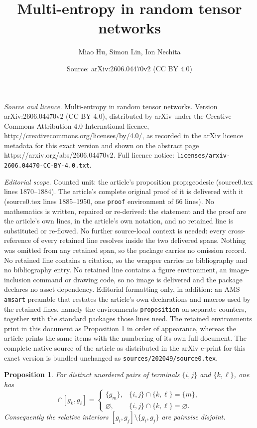 \documentclass[10pt,a4paper]{amsart}
\title{Multi-entropy in random tensor networks}
\author{Miao Hu, Simon Lin, Ion Nechita}
\date{Source: arXiv:2606.04470v2 (CC BY 4.0)}
\newtheorem{proposition}{Proposition}
\begin{document}
\maketitle

\noindent\emph{Source and licence.} Multi-entropy in random tensor networks. Version arXiv:2606.04470v2 (CC BY 4.0), distributed by arXiv under the Creative Commons Attribution 4.0 International licence, http://creativecommons.org/licenses/by/4.0/, as recorded in the arXiv licence metadata for this exact version and shown on the abstract page https://arxiv.org/abs/2606.04470v2. Full licence notice: \texttt{licenses/arxiv-2606.04470-CC-BY-4.0.txt}.\par\smallskip

\noindent\textit{Editorial scope.} Counted unit: the article's proposition prop:geodesic (source0.tex lines 1870--1884). The article's complete original proof of it is delivered with it (source0.tex lines 1885--1950, one \texttt{proof} environment of 66 lines). No mathematics is written, repaired or re-derived: the statement and the proof are the article's own lines, in the article's own notation, and no retained line is substituted or re-flowed.  No further source-local context is needed: every cross-reference of every retained line resolves inside the two delivered spans.  Nothing was omitted from any retained span, so the package carries no omission record.  No retained line contains a citation, so the wrapper carries no bibliography and no bibliography entry.  No retained line contains a figure environment, an image-inclusion command or drawing code, so no image is delivered and the package declares no asset dependency.  Editorial formatting only, in addition: an AMS \texttt{amsart} preamble that restates the article's own declarations and macros used by the retained lines, namely the environments \texttt{proposition} on separate counters, together with the standard packages those lines need.  The retained environments print in this document as Proposition 1 in order of appearance, whereas the article prints the same items with the numbering of its own full document.  The complete native source of the article as distributed in the arXiv e-print for this exact version is bundled unchanged as \texttt{sources/202049/source0.tex}.
\begin{proposition}
\label{prop:geodesic}
For distinct unordered pairs of terminals $\{i,j\}$ and $\{k,\ell\}$, one has
\begin{equation}
[g_i,g_j]\cap[g_k,g_\ell]
=
\begin{cases}
\{g_m\}, & \{i,j\}\cap\{k,\ell\}=\{m\},\\
\varnothing, & \{i,j\}\cap\{k,\ell\}=\varnothing.
\end{cases}
\label{eq:pairwise-geodesic-interval-intersection}
\end{equation}
Consequently the relative interiors
$[g_i,g_j]\setminus\{g_i,g_j\}$ are pairwise disjoint.
\end{proposition}
\end{document}
